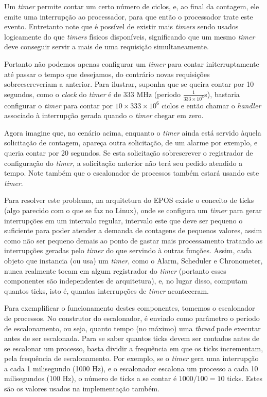 Um \emph{timer} permite contar um certo número de ciclos, e, ao final da contagem, ele emite uma interrupção ao processador, para que então o processador trate este evento. Entretanto note que é possível de existir mais \emph{timers} sendo usados logicamente do que \emph{timers} físicos disponíveis, significando que um mesmo \emph{timer} deve conseguir servir a mais de uma requisição simultaneamente.

Portanto não podemos apenas configurar um \emph{timer} para contar initerruptamente até passar o tempo que desejamos, do contrário novas requisições sobreescreveriam a anterior. Para ilustrar, suponha que se queira contar por 10 segundos, como o \emph{clock} do \emph{timer} é de 333 MHz (periodo $\frac{1}{333 \times 10^6}$s), bastaria configurar o \emph{timer} para contar por $10 \times 333 \times 10^6$ ciclos e então chamar o \emph{handler} associado à interrupção gerada quando o \emph{timer} chegar em zero.

Agora imagine que, no cenário acima, enquanto o \emph{timer} ainda está servido àquela solicitação de contagem, apareça outra solicitação, de um alarme por exemplo, e queria contar por 20 segundos. Se esta solicitação sobrescrever o registrador de configuração do \emph{timer}, a solicitação anterior não terá seu pedido atendido a tempo. Note também que o escalonador de processos também estará usando este \emph{timer}.

Para resolver este problema, na arquitetura do EPOS existe o conceito de ticks (algo parecido com o que se faz no Linux), onde se configura um \emph{timer} para gerar interrupções em um intervalo regular, intervalo este que deve ser pequeno o suficiente para poder atender a demanda de contagens de pequenos valores, assim como não ser pequeno demais ao ponto de gastar mais processamento tratando as interrupções geradas pelo \emph{timer} do que servindo à outras funções. Assim, cada objeto que instancia (ou usa) um \emph{timer}, como o Alarm, Scheduler e Chronometer, nunca realmente tocam em algum registrador do \emph{timer} (portanto esses componentes são independentes de arquitetura), e, no lugar disso, computam quantos ticks, isto é, quantas interrupções de \emph{timer} aconteceram.

Para exemplificar o funcionamento destes componentes, tomemos o escalonador de processos. No construtor do escalonador, é enviado como parâmetro o periodo de escalonamento, ou seja, quanto tempo (no máximo) uma \emph{thread} pode executar antes de ser escalonada. Para se saber quantos ticks devem ser contados antes de se escalonar um processo, basta dividir a frequência em que os ticks incrementam, pela frequência de escalonamento. Por exemplo, se o \emph{timer} gera uma interrupção a cada 1 milisegundo (1000 Hz), e o escalonador escalona um processo a cada 10 milisegundos (100 Hz), o número de ticks a se contar é $1000/100 = 10$ ticks. Estes são os valores usados na implementação também.

